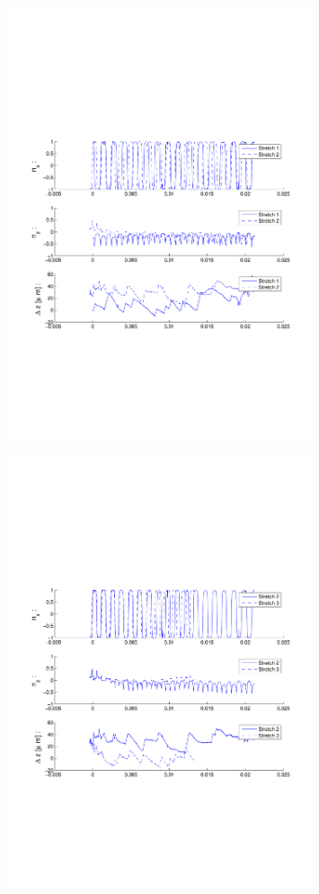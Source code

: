 \begin{figure}[ H]

\centering

\includegraphics[width=0.8\textwidth]{Images/Particle 24/Stretch1.pdf}

\end{figure}

\begin{figure}[ H]

\centering

\includegraphics[width=0.8\textwidth]{Images/Particle 24/Stretch2.pdf}

\end{figure}
